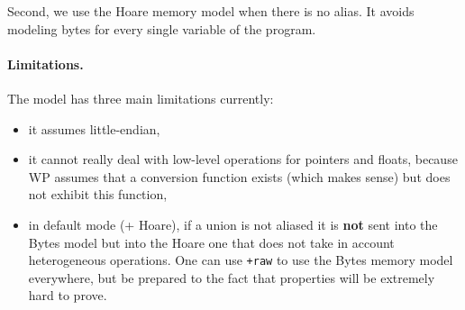 Second, we use the Hoare memory model when there is no alias. It avoids modeling
bytes for every single variable of the program.

\paragraph{Limitations.} The model has three main limitations currently:
\begin{itemize}
  \item it assumes little-endian,
  \item it cannot really deal with low-level operations for pointers and floats,
        because WP assumes that a conversion function exists (which makes sense)
        but does not exhibit this function,
  \item in default mode (+ Hoare), if a union is not aliased it is \textbf{not}
        sent into the Bytes model but into the Hoare one that does not take in
        account heterogeneous operations. One can use \texttt{+raw} to use the
        Bytes memory model everywhere, but be prepared to the fact that
        properties will be extremely hard to prove.
\end{itemize}

